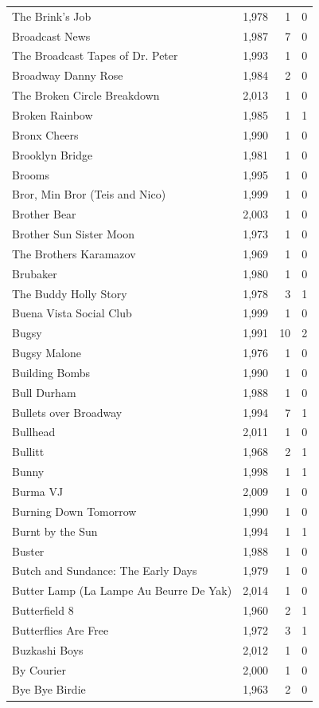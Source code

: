 \begin{tabular}{lrrr}
The Brink's Job & 1,978 & 1 & 0 \\
Broadcast News & 1,987 & 7 & 0 \\
The Broadcast Tapes of Dr. Peter & 1,993 & 1 & 0 \\
Broadway Danny Rose & 1,984 & 2 & 0 \\
The Broken Circle Breakdown & 2,013 & 1 & 0 \\
Broken Rainbow & 1,985 & 1 & 1 \\
Bronx Cheers & 1,990 & 1 & 0 \\
Brooklyn Bridge & 1,981 & 1 & 0 \\
Brooms & 1,995 & 1 & 0 \\
Bror, Min Bror (Teis and Nico) & 1,999 & 1 & 0 \\
Brother Bear & 2,003 & 1 & 0 \\
Brother Sun Sister Moon & 1,973 & 1 & 0 \\
The Brothers Karamazov & 1,969 & 1 & 0 \\
Brubaker & 1,980 & 1 & 0 \\
The Buddy Holly Story & 1,978 & 3 & 1 \\
Buena Vista Social Club & 1,999 & 1 & 0 \\
Bugsy & 1,991 & 10 & 2 \\
Bugsy Malone & 1,976 & 1 & 0 \\
Building Bombs & 1,990 & 1 & 0 \\
Bull Durham & 1,988 & 1 & 0 \\
Bullets over Broadway & 1,994 & 7 & 1 \\
Bullhead & 2,011 & 1 & 0 \\
Bullitt & 1,968 & 2 & 1 \\
Bunny & 1,998 & 1 & 1 \\
Burma VJ & 2,009 & 1 & 0 \\
Burning Down Tomorrow & 1,990 & 1 & 0 \\
Burnt by the Sun & 1,994 & 1 & 1 \\
Buster & 1,988 & 1 & 0 \\
Butch and Sundance: The Early Days & 1,979 & 1 & 0 \\
Butter Lamp (La Lampe Au Beurre De Yak) & 2,014 & 1 & 0 \\
Butterfield 8 & 1,960 & 2 & 1 \\
Butterflies Are Free & 1,972 & 3 & 1 \\
Buzkashi Boys & 2,012 & 1 & 0 \\
By Courier & 2,000 & 1 & 0 \\
Bye Bye Birdie & 1,963 & 2 & 0 \\

\end{tabular}
